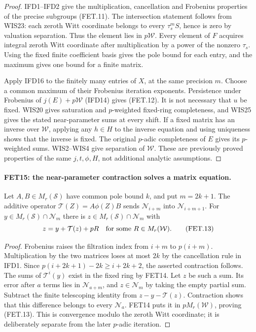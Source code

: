 \documentclass[11pt,a4paper]{article}
\numberwithin{equation}{section}
\theoremstyle{remark}\newtheorem{remark}[theorem]{Remark}
\begin{document}
\begin{proof}
IFD1--IFD2 give the multiplication, cancellation and Frobenius
properties of the precise subgroups (FET.11).
The intersection statement follows from WIS23: each zeroth Witt
coordinate belongs to every $\tau_s^m S$, hence is zero by
valuation separation. Thus the element lies in $p\mathcal W$.
Every element of $F$ acquires integral zeroth Witt coordinate
after multiplication by a power of the nonzero $\tau_s$.
Using the fixed finite coefficient basis gives the pole bound for
each entry, and the maximum gives one bound for a finite matrix.

Apply IFD16 to the finitely many entries of $X$, at the same
precision $m$. Choose a common maximum of their Frobenius
iteration exponents. Persistence under Frobenius of $j(E)+p\mathcal W$
(IFD14) gives (FET.12). It is not necessary that $u$ be fixed.
WIS20 gives saturation and $p$-weighted fixed-ring completeness,
and WIS25 gives the stated near-parameter sums at every shift.
If a fixed matrix has an inverse over $\mathcal W$, applying any
$h\in H$ to the inverse equation and using uniqueness shows that
the inverse is fixed. The original $p$-adic completeness of $E$
gives its $p$-weighted sums. WIS2--WIS4 give separation of
$\mathcal W$. These are previously proved properties of the
same $j,t,\phi,H$, not additional analytic assumptions.
\end{proof}

\paragraph{FET15: the near-parameter contraction solves a matrix equation.}
\label{claim:FET15}
Let $A,B\in M_r(\mathcal S)$ have common pole bound $k$,
and put $m=2k+1$. The additive operator
$\mathcal T(Z)=A\phi(Z)B$ sends
$\mathcal N_{i+m}$ into $\mathcal N_{i+m+1}$.
For $y\in M_r(\mathcal S)\cap\mathcal N_m$ there is
$z\in M_r(\mathcal S)\cap\mathcal N_m$ with
\[
                         z=y+\mathcal T(z)+pR
                      \quad\hbox{for some }R\in M_r(\mathcal W).
                                                               \tag{FET.13}
\]

\begin{proof}
Frobenius raises the filtration index from $i+m$ to $p(i+m)$.
Multiplication by the two matrices loses at most $2k$ by the
cancellation rule in IFD1. Since
$p(i+2k+1)-2k\geq i+2k+2$, the asserted contraction follows.
The sums of $\mathcal T^i(y)$ exist in the fixed ring by FET14.
Let $z$ be such a sum. Its error after $a$ terms lies in
$\mathcal N_{a+m}$, and $z\in\mathcal N_m$ by taking the
empty partial sum. Subtract the finite telescoping identity
from $z-y-\mathcal T(z)$. Contraction shows that this difference
belongs to every $\mathcal N_a$. FET14 puts it in
$pM_r(\mathcal W)$, proving (FET.13).
This is convergence modulo the zeroth Witt coordinate; it is
deliberately separate from the later $p$-adic iteration.
\end{proof}
\end{document}

